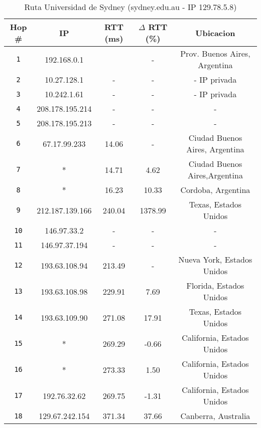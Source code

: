 \begin{table}[ht]\begin{center}
    \begin{tabular}{|c|c|c|c|c|}
    \hline
    \textbf{Hop \#} & \textbf{IP}& \textbf{RTT (ms)} & \textbf{$\Delta$ RTT (\%)} & \textbf{Ubicacion} \\ \hline
    \texttt{1} & 192.168.0.1      &     & -       & Prov. Buenos Aires, Argentina   \\ \hline
    \texttt{2} & 10.27.128.1                & -       & -       & - IP privada  \\ \hline
    \texttt{3} & 10.242.1.61                & -       & -       & - IP privada  \\ \hline
    \texttt{4} & 208.178.195.214                & -       & -       & -   \\ \hline
    \texttt{5} & 208.178.195.213                & -       & -       & -   \\ \hline
    \texttt{6} & 67.17.99.233     & 14.06   & -       & Ciudad Buenos Aires, Argentina    \\ \hline
    \texttt{7} & *   & 14.71    & 4.62   & Ciudad Buenos Aires,Argentina   \\ \hline
    \texttt{8} & *    & 16.23    & 10.33  & Cordoba, Argentina   \\ \hline
    \texttt{9} & 212.187.139.166     & 240.04  & 1378.99 & Texas, Estados Unidos   \\ \hline
    \texttt{10} & 146.97.33.2               & -       & -       & -   \\ \hline
    \texttt{11} & 146.97.37.194               & -       & -       & -    \\ \hline
    \texttt{12} & 193.63.108.94     & 213.49  & -       & Nueva York, Estados Unidos   \\ \hline
    \texttt{13} & 193.63.108.98   & 229.91  & 7.69    & Florida, Estados Unidos   \\ \hline
    \texttt{14} & 193.63.109.90   & 271.08  & 17.91   & Texas, Estados Unidos   \\ \hline
    \texttt{15} & *    & 269.29  & -0.66   & California, Estados Unidos   \\ \hline
    \texttt{16} & *   & 273.33  & 1.50    & California, Estados Unidos    \\ \hline
    \texttt{17} & 192.76.32.62   & 269.75  & -1.31   & California, Estados Unidos   \\ \hline
    \texttt{18} & 129.67.242.154 & 371.34  & 37.66   & Canberra, Australia   \\ \hline
    \end{tabular}
    \caption{Ruta Universidad de Sydney (sydney.edu.au - IP 129.78.5.8)}
\end{center}\end{table}




